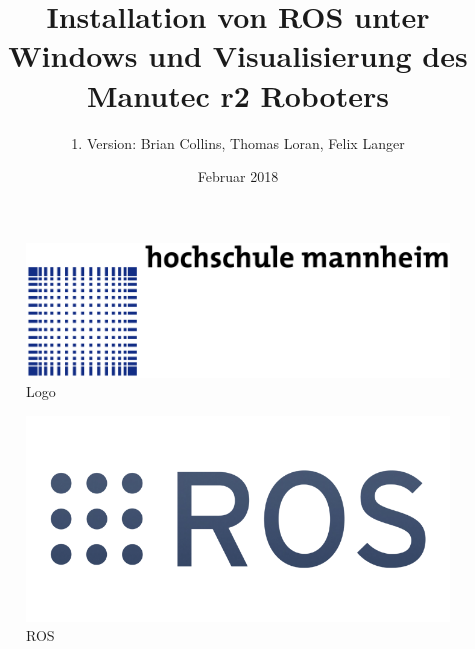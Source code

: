 \documentclass{article}
\title{Installation von ROS unter Windows und Visualisierung des Manutec r2 Roboters}
\author{1. Version: Brian Collins, Thomas Loran, Felix Langer}
\date{Februar 2018}
\begin{document}
\maketitle
\thispagestyle{empty}


\begin{figure}[H]
\centering
\includegraphics[scale=1]{Bilder/Logo.png}
\caption{Logo}
\label{fig:Logo}
\end{figure}

\begin{figure}[H]
\centering
\includegraphics[scale=0.35]{Bilder/ROS.png}
\caption{ROS}
\label{fig:ROS}
\end{figure}

\newpage
\tableofcontents
\thispagestyle{empty}
\newpage

\setcounter{page}{1}





\newpage

\listoffigures
\thispagestyle{empty}
\end{document}
